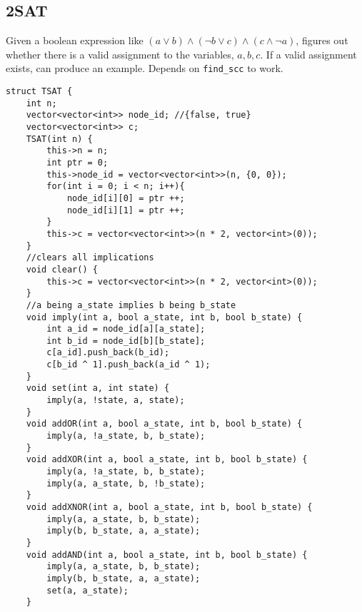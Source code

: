 \documentclass[8pt, headheight=10pt, a4paper]{article}
\begin{document}
\begin{multicols*}{3}
\subsection{2SAT}
Given a boolean expression like $(a \lor b) \land (\lnot b \lor c) \land (c \land \lnot a)$, figures out whether there is a valid assignment to the variables, $a, b, c$. If a valid assignment exists, can produce an example. 
Depends on \lstinline{find_scc} to work. 
\begin{lstlisting}
struct TSAT {
    int n;
    vector<vector<int>> node_id; //{false, true}
    vector<vector<int>> c;
    TSAT(int n) {
        this->n = n;
        int ptr = 0;
        this->node_id = vector<vector<int>>(n, {0, 0});
        for(int i = 0; i < n; i++){
            node_id[i][0] = ptr ++;
            node_id[i][1] = ptr ++;
        }
        this->c = vector<vector<int>>(n * 2, vector<int>(0));
    }
    //clears all implications
    void clear() {
        this->c = vector<vector<int>>(n * 2, vector<int>(0));
    }
    //a being a_state implies b being b_state
    void imply(int a, bool a_state, int b, bool b_state) {
        int a_id = node_id[a][a_state];
        int b_id = node_id[b][b_state];
        c[a_id].push_back(b_id);            
        c[b_id ^ 1].push_back(a_id ^ 1); 
    }
    void set(int a, int state) {
        imply(a, !state, a, state);       
    }
    void addOR(int a, bool a_state, int b, bool b_state) {
        imply(a, !a_state, b, b_state);     
    }
    void addXOR(int a, bool a_state, int b, bool b_state) {
        imply(a, !a_state, b, b_state);     
        imply(a, a_state, b, !b_state);     
    }
    void addXNOR(int a, bool a_state, int b, bool b_state) {
        imply(a, a_state, b, b_state);      
        imply(b, b_state, a, a_state);      
    }
    void addAND(int a, bool a_state, int b, bool b_state) {
        imply(a, a_state, b, b_state);      
        imply(b, b_state, a, a_state);      
        set(a, a_state);                    
    }


\end{lstlisting}
\end{multicols*}
\end{document}

